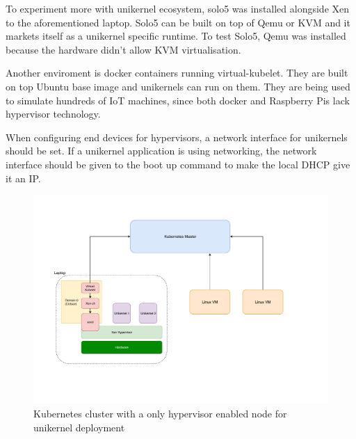 To experiment more with unikernel ecosystem, solo5 was installed alongside Xen to the aforementioned laptop. Solo5 can be built on top of Qemu or KVM and it markets itself as a unikernel specific runtime. To test Solo5, Qemu was installed because the hardware didn't allow KVM virtualisation.

Another enviroment is docker containers running virtual-kubelet. They are built on top Ubuntu base image and unikernels can run on them. They are being used to simulate hundreds of IoT machines, since both docker and Raspberry Pis lack hypervisor technology.

When configuring end devices for hypervisors, a network interface for unikernels should be set. If a unikernel application is using networking, the network interface should be given to the boot up command to make the local DHCP give it an IP.


\begin{figure}[htpb]
  
    \centering
    \includegraphics[width=1.2\textwidth]{figures/arch_new.pdf}
    \caption{ Kubernetes cluster with a only hypervisor enabled node for unikernel deployment} \label{fig:hypervisor}
  \end{figure}

\pagebreak